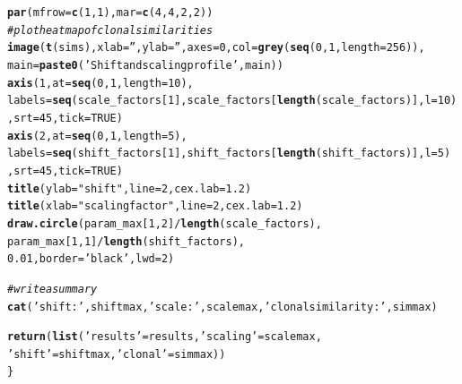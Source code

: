 \documentclass[12pt]{article}\usepackage[]{graphicx}\usepackage[]{color}
\makeatletter
\newcommand{\hlnum}[1]{\textcolor[rgb]{0.686,0.059,0.569}{#1}}%
\newcommand{\hlstr}[1]{\textcolor[rgb]{0.192,0.494,0.8}{#1}}%
\newcommand{\hlcom}[1]{\textcolor[rgb]{0.678,0.584,0.686}{\textit{#1}}}%
\newcommand{\hlopt}[1]{\textcolor[rgb]{0,0,0}{#1}}%
\newcommand{\hlstd}[1]{\textcolor[rgb]{0.345,0.345,0.345}{#1}}%
\newcommand{\hlkwc}[1]{\textcolor[rgb]{0.333,0.667,0.333}{#1}}%
\newcommand{\hlkwd}[1]{\textcolor[rgb]{0.737,0.353,0.396}{\textbf{#1}}}%
\newenvironment{kframe}{%
 \def\at@end@of@kframe{}%
 \ifinner\ifhmode%
  \def\at@end@of@kframe{\end{minipage}}%
  \begin{minipage}{\columnwidth}%
 \fi\fi%
 \def\FrameCommand##1{\hskip\@totalleftmargin \hskip-\fboxsep
 \colorbox{shadecolor}{##1}\hskip-\fboxsep
     \hskip-\linewidth \hskip-\@totalleftmargin \hskip\columnwidth}%
 \MakeFramed {\advance\hsize-\width
   \@totalleftmargin\z@ \linewidth\hsize
   \@setminipage}}%
 {\par\unskip\endMakeFramed%
 \at@end@of@kframe}
\newenvironment{knitrout}{}{} %
\makeatother
\begin{document}
\begin{knitrout}
\begin{kframe}
\begin{alltt}
  \hlkwd{par}\hlstd{(} \hlkwc{mfrow} \hlstd{=} \hlkwd{c}\hlstd{(}\hlnum{1}\hlstd{,}\hlnum{1}\hlstd{),} \hlkwc{mar} \hlstd{=} \hlkwd{c}\hlstd{(}\hlnum{4}\hlstd{,}\hlnum{4}\hlstd{,}\hlnum{2}\hlstd{,}\hlnum{2}\hlstd{))}
  \hlcom{#plot heatmap of clonal similarities}
  \hlkwd{image}\hlstd{(}\hlkwd{t}\hlstd{(sims),} \hlkwc{xlab}\hlstd{=}\hlstr{''}\hlstd{,} \hlkwc{ylab}\hlstd{=}\hlstr{''}\hlstd{,} \hlkwc{axes}\hlstd{=}\hlnum{0}\hlstd{,} \hlkwc{col}\hlstd{=}\hlkwd{grey}\hlstd{(}\hlkwd{seq}\hlstd{(}\hlnum{0}\hlstd{,} \hlnum{1}\hlstd{,} \hlkwc{length} \hlstd{=} \hlnum{256}\hlstd{)),}
        \hlkwc{main} \hlstd{=} \hlkwd{paste0}\hlstd{(}\hlstr{'Shift and scaling profile '}\hlstd{, main) )}
  \hlkwd{axis}\hlstd{(}\hlnum{1}\hlstd{,} \hlkwc{at} \hlstd{=} \hlkwd{seq}\hlstd{(}\hlnum{0}\hlstd{,} \hlnum{1}\hlstd{,} \hlkwc{length} \hlstd{=} \hlnum{10}\hlstd{),}
       \hlkwc{labels}\hlstd{=}\hlkwd{seq}\hlstd{(scale_factors[}\hlnum{1}\hlstd{], scale_factors[}\hlkwd{length}\hlstd{(scale_factors)],} \hlkwc{l}\hlstd{=}\hlnum{10}\hlstd{)}
       \hlstd{,}\hlkwc{srt}\hlstd{=}\hlnum{45}\hlstd{,}\hlkwc{tick}\hlstd{=}\hlnum{TRUE}\hlstd{)}
  \hlkwd{axis}\hlstd{(}\hlnum{2}\hlstd{,} \hlkwc{at} \hlstd{=} \hlkwd{seq}\hlstd{(}\hlnum{0}\hlstd{,} \hlnum{1}\hlstd{,} \hlkwc{length} \hlstd{=} \hlnum{5}\hlstd{),}
       \hlkwc{labels}\hlstd{=}\hlkwd{seq}\hlstd{( shift_factors[}\hlnum{1}\hlstd{],shift_factors[}\hlkwd{length}\hlstd{(shift_factors)],} \hlkwc{l}\hlstd{=}\hlnum{5}\hlstd{)}
       \hlstd{,}\hlkwc{srt}\hlstd{=}\hlnum{45}\hlstd{,}\hlkwc{tick}\hlstd{=}\hlnum{TRUE}\hlstd{)}
  \hlkwd{title}\hlstd{(}\hlkwc{ylab}\hlstd{=}\hlstr{"shift"}\hlstd{,} \hlkwc{line}\hlstd{=}\hlnum{2}\hlstd{,} \hlkwc{cex.lab}\hlstd{=}\hlnum{1.2}\hlstd{)}
  \hlkwd{title}\hlstd{(}\hlkwc{xlab}\hlstd{=}\hlstr{"scaling factor"}\hlstd{,} \hlkwc{line}\hlstd{=}\hlnum{2}\hlstd{,} \hlkwc{cex.lab}\hlstd{=}\hlnum{1.2}\hlstd{)}
  \hlkwd{draw.circle}\hlstd{(param_max[}\hlnum{1}\hlstd{,}\hlnum{2}\hlstd{]}\hlopt{/}\hlkwd{length}\hlstd{(scale_factors),}
              \hlstd{param_max[}\hlnum{1}\hlstd{,}\hlnum{1}\hlstd{]}\hlopt{/}\hlkwd{length}\hlstd{(shift_factors),}
              \hlnum{0.01}\hlstd{,} \hlkwc{border}\hlstd{=}\hlstr{'black'}\hlstd{,} \hlkwc{lwd}\hlstd{=}\hlnum{2}\hlstd{)}

  \hlcom{#write a summary}
  \hlkwd{cat}\hlstd{(}\hlstr{'shift:'}\hlstd{, shiftmax,} \hlstr{'scale:'}\hlstd{, scalemax,}\hlstr{'clonal similarity:'}\hlstd{, simmax)}

  \hlkwd{return}\hlstd{(}\hlkwd{list}\hlstd{(}\hlstr{'results'}\hlstd{=results,} \hlstr{'scaling'}\hlstd{=scalemax,}
              \hlstr{'shift'}\hlstd{=shiftmax,} \hlstr{'clonal'}\hlstd{=simmax))}
\hlstd{\}}
\end{alltt}
\end{kframe}
\end{knitrout}
\end{document}
